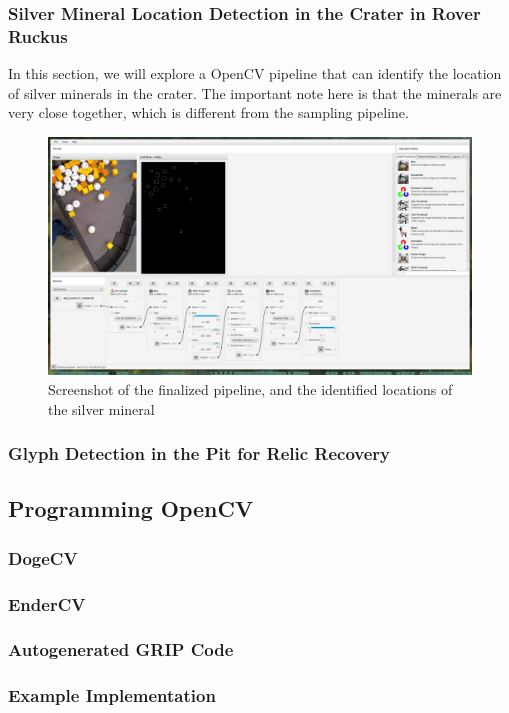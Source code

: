 \documentclass[../main.tex]{subfiles}
\begin{document}
\subsubsection{Silver Mineral Location Detection in the Crater in Rover Ruckus}
In this section, we will explore a OpenCV pipeline that can identify the location of silver minerals in the crater. The important note here is that the minerals are very close together, which is different from the sampling pipeline.
\begin{figure}[H]
    \centering
    \includegraphics[width=400pt]{sections/vision/images/opencv/crater_grip_screenshot.png}
    \caption{Screenshot of the finalized pipeline, and the identified locations of the silver mineral}
\end{figure}
\subsubsection{Glyph Detection in the Pit for Relic Recovery}
\subsection{Programming OpenCV}
\subsubsection{DogeCV}
\subsubsection{EnderCV}
\subsubsection{Autogenerated GRIP Code}
\subsubsection{Example Implementation}
\inputminted[breaklines, fontsize=\small]{java}{sections/vision/code/GoldDetectorPipeline.java}
\inputminted[breaklines, fontsize=\small]{java}{sections/vision/code/GoldDetectorWrapper.java}
\end{document}
